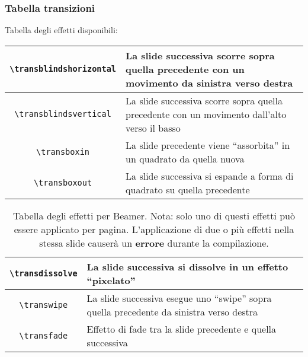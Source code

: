 \begin{frame}[allowframebreaks]
  \frametitle{Tabella transizioni}
  
  Tabella degli effetti disponibili:


\begin{table}[t]
\centering
\begin{xtabular}{|c|p{5cm}|}
\hline

\texttt{\textbackslash transblindshorizontal} & La slide successiva scorre 
sopra quella precedente con un movimento da sinistra verso destra \\ \hline
\texttt{\textbackslash transblindsvertical}   & La slide successiva scorre 
sopra quella precedente con un movimento dall'alto verso il basso \\ \hline
\texttt{\textbackslash transboxin}            & La slide precedente viene 
``assorbita'' in un quadrato da quella nuova                       \\ \hline
\texttt{\textbackslash transboxout}           & La slide successiva si espande 
a forma di quadrato su quella precedente                      \\ \hline
\end{xtabular}
\end{table}
\begin{table}[t]
\centering
\begin{xtabular}{|c|p{5cm}|}
\hline
\texttt{\textbackslash transdissolve}         & La slide successiva si dissolve 
in un effetto ``pixelato''                                   \\ \hline
\texttt{\textbackslash transwipe}             & La slide successiva esegue uno 
``swipe'' sopra quella precedente da sinistra verso destra    \\ \hline
\texttt{\textbackslash transfade}             & Effetto di fade tra la slide 
precedente e quella successiva                                  \\ \hline
\end{xtabular}
\caption[Tabella degli effetti Beamer]{Tabella degli effetti per Beamer. Nota: solo uno di questi effetti può essere applicato per pagina. L'applicazione di due o più effetti nella stessa slide causerà un \textbf{errore} durante la compilazione.}
\label{tab:beamer_effects}
\end{table}
\end{frame}
